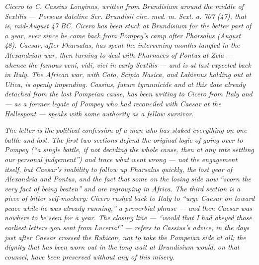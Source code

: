 
\textit{Cicero to C. Cassius Longinus, written from Brundisium
around the middle of Sextilis --- Perseus dateline
\textit{Scr. Brundisii circ. med. m. Sext. a. 707 (47)}, that
is, mid-August 47 BC. Cicero has been stuck at Brundisium for
the better part of a year, ever since he came back from
Pompey's camp after Pharsalus (August 48). Caesar, after
Pharsalus, has spent the intervening months tangled in the
Alexandrian war, then turning to deal with Pharnaces of
Pontus at Zela --- whence the famous \textit{veni, vidi, vici}
in early Sextilis --- and is at last expected back in Italy.
The African war, with Cato, Scipio Nasica, and Labienus
holding out at Utica, is openly impending. Cassius, future
tyrannicide and at this date already detached from the lost
Pompeian cause, has been writing to Cicero from Italy and ---
as a former legate of Pompey who had reconciled with Caesar
at the Hellespont --- speaks with some authority as a fellow
survivor.}

\textit{The letter is the political confession of a man who
has staked everything on one battle and lost. The first two
sections defend the original logic of going over to Pompey
(``a single battle, if not deciding the whole cause, then at
any rate settling our personal judgement'') and trace what
went wrong --- not the engagement itself, but Caesar's
inability to follow up Pharsalus quickly, the lost year of
Alexandria and Pontus, and the fact that some on the losing
side now ``scorn the very fact of being beaten'' and are
regrouping in Africa. The third section is a piece of bitter
self-mockery: Cicero rushed back to Italy to ``urge Caesar on
toward peace while he was already running,'' a proverbial
phrase --- and then Caesar was nowhere to be seen for a year.
The closing line --- ``would that I had obeyed those earliest
letters you sent from Luceria!'' --- refers to Cassius's
advice, in the days just after Caesar crossed the Rubicon, not
to take the Pompeian side at all; the dignity that has been
worn out in the long wait at Brundisium would, on that
counsel, have been preserved without any of this misery.}
